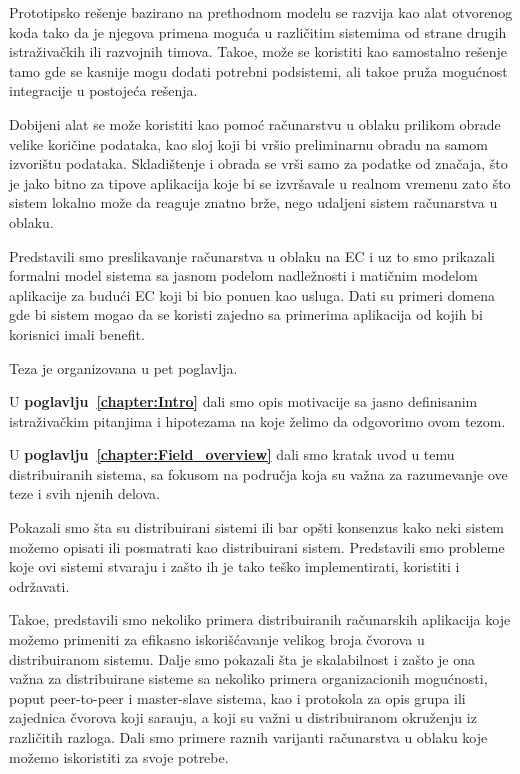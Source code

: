 Prototipsko re\v senje bazirano na prethodnom modelu se razvija kao alat otvorenog koda tako da je njegova primena mogu\'ca u razli\v citim sistemima od strane drugih istra\v ziva\v ckih ili razvojnih timova. Tako\dj e, mo\v ze se koristiti kao samostalno re\v senje tamo gde se kasnije mogu dodati potrebni podsistemi, ali tako\dj e pru\v za mogu\'cnost integracije u postoje\'ca re\v senja.

Dobijeni alat se mo\v ze koristiti kao pomo\'c ra\v cunarstvu u oblaku prilikom obrade velike kori\v cine podataka, kao sloj koji bi vr\v sio preliminarnu obradu na samom izvori\v stu podataka. Skladi\v stenje i obrada se vr\v si samo za podatke od zna\v caja, \v sto je jako bitno za tipove aplikacija koje bi se izvr\v savale u realnom vremenu zato \v sto sistem lokalno mo\v ze da reaguje znatno br\v ze, nego udaljeni sistem ra\v cunarstva u oblaku.

Predstavili smo preslikavanje ra\v cunarstva u oblaku na EC i uz to smo prikazali formalni model sistema sa jasnom podelom nadle\v znosti i mati\v cnim modelom aplikacije za budu\'ci EC koji bi bio ponu\dj en kao usluga. Dati su primeri domena gde bi sistem mogao da se koristi zajedno sa primerima aplikacija od kojih bi korisnici imali benefit. 

\noindent
Teza je organizovana u pet poglavlja.

U \textbf{poglavlju~\ref{chapter:Intro}} dali smo opis motivacije sa jasno definisanim istra\v ziva\v ckim pitanjima i hipotezama na koje \v zelimo da odgovorimo ovom tezom.

U \textbf{poglavlju~\ref{chapter:Field_overview}} dali smo kratak uvod u temu distribuiranih sistema, sa fokusom na podru\v cja koja su va\v zna za razumevanje ove teze i svih njenih delova.

Pokazali smo \v sta su distribuirani sistemi ili bar op\v sti konsenzus kako neki sistem mo\v zemo opisati ili posmatrati kao distribuirani sistem. Predstavili smo probleme koje ovi sistemi stvaraju i za\v sto ih je tako te\v sko implementirati, koristiti i odr\v zavati.

Tako\dj e, predstavili smo nekoliko primera distribuiranih ra\v cunarskih aplikacija koje mo\v zemo primeniti za efikasno iskori\v s\'cavanje velikog broja \v cvorova u distribuiranom sistemu. Dalje smo pokazali \v sta je skalabilnost i za\v sto je ona va\v zna za distribuirane sisteme sa nekoliko primera organizacionih mogu\'cnosti, poput peer-to-peer i master-slave sistema, kao i protokola za opis grupa ili zajednica \v cvorova koji sara\dj uju, a koji su va\v zni u distribuiranom okru\v zenju iz razli\v citih razloga. Dali smo primere raznih varijanti ra\v cunarstva u oblaku koje mo\v zemo iskoristiti za svoje potrebe.

